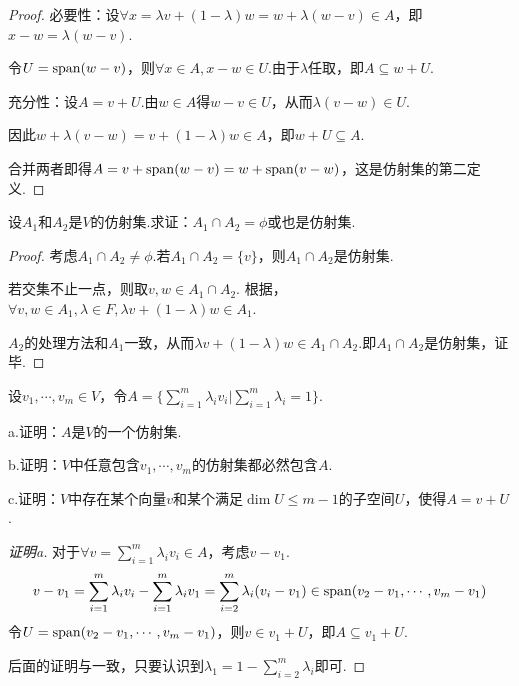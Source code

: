 \begin{proof}
    必要性：设\(\forall x=\lambda v+(1-\lambda)w=w+\lambda(w-v) \in A\)，即\(x-w=\lambda(w-v)\).

    令\(U=\operatorname{span}(w-v)\)，则\(\forall x \in A,x-w \in U\).由于\(\lambda\)任取，即\(A \subseteq w+U\).

    充分性：设\(A=v+U\).由\(w \in A\)得\(w-v \in U\)，从而\(\lambda(v-w) \in U\).

    因此\(w+\lambda(v-w)=v+(1-\lambda)w \in A\)，即\(w+U \subseteq A\).

    合并两者即得\(A=v+\operatorname{span}(w-v)=w+\operatorname{span}(v-w)\)，{\kaishu 这是仿射集的第二定义.}
\end{proof}

\begin{problem}[9]\label{3.E.9}
    设\(A_1\)和\(A_2\)是\(V\)的仿射集.求证：\(A_1 \cap A_2=\phi\)或也是仿射集.
\end{problem}

\begin{proof}
    考虑\(A_1 \cap A_2 \ne \phi\).若\(A_1 \cap A_2=\{v\}\)，则\(A_1 \cap A_2\)是仿射集.

    若交集不止一点，则取\(v,w \in A_1 \cap A_2\).
    根据，\(\forall v,w \in A_1,\lambda \in F,\lambda v+(1-\lambda)w \in A_1\).

    \(A_2\)的处理方法和\(A_1\)一致，从而\(\lambda v+(1- \lambda)w \in A_1 \cap A_2\).即\(A_1 \cap A_2\)是仿射集，证毕.
\end{proof}

\newpage

\begin{problem}[11]\label{3.E.11}
    设\(v_1,\cdots,v_m \in V\)，令\(A=\{\sum_{i=1}^m \lambda_i v_i|\sum_{i=1}^m \lambda_i=1\}\).

    a.证明：\(A\)是\(V\)的一个仿射集.

    b.证明：\(V\)中任意包含\(v_1,\cdots,v_m\)的仿射集都必然包含\(A\).

    c.证明：\(V\)中存在某个向量\(v\)和某个满足\(\dim U \leq m-1\)的子空间\(U\)，使得\(A=v+U\).
\end{problem}

\begin{proof}[证明a]
    对于\(\forall v=\sum_{i=1}^m \lambda_i v_i \in A\)，考虑\(v-v_1\).
    \begin{align*}
        v-v_1=\sum_{i=1}^m \lambda_i v_i-\sum_{i=1}^m \lambda_i v_1=\sum_{i=2}^m \lambda_i(v_i-v_1) 
        \in \operatorname{span}(v_2-v_1,\cdots,v_m-v_1)
    \end{align*}
    令\(U=\operatorname{span}(v_2-v_1,\cdots,v_m-v_1)\)，则\(v \in v_1+U\)，即\(A \subseteq v_1+U\).

    后面的证明与一致，只要认识到\(\lambda_1=1-\sum_{i=2}^m \lambda_i\)即可.
\end{proof}

